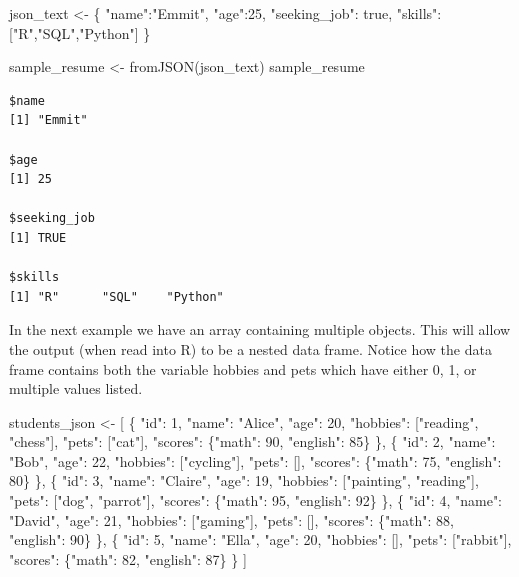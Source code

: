\documentclass[
  letterpaper,
  DIV=11,
  numbers=noendperiod]{scrreprt}
\newenvironment{Shaded}{\begin{snugshade}}{\end{snugshade}}
\newcommand{\FunctionTok}[1]{\textcolor[rgb]{0.28,0.35,0.67}{#1}}
\newcommand{\NormalTok}[1]{\textcolor[rgb]{0.00,0.23,0.31}{#1}}
\newcommand{\OtherTok}[1]{\textcolor[rgb]{0.00,0.23,0.31}{#1}}
\newcommand{\StringTok}[1]{\textcolor[rgb]{0.13,0.47,0.30}{#1}}
\begin{document}
\begin{Shaded}
\begin{Highlighting}[]
\NormalTok{json\_text }\OtherTok{\textless{}{-}} \StringTok{\textquotesingle{}\{}
\StringTok{                "name":"Emmit",}
\StringTok{                "age":25,}
\StringTok{                "seeking\_job": true,}
\StringTok{                "skills":["R","SQL","Python"]}
\StringTok{              \}\textquotesingle{}}

\NormalTok{sample\_resume }\OtherTok{\textless{}{-}} \FunctionTok{fromJSON}\NormalTok{(json\_text)}
\NormalTok{sample\_resume}
\end{Highlighting}
\end{Shaded}

\begin{verbatim}
$name
[1] "Emmit"

$age
[1] 25

$seeking_job
[1] TRUE

$skills
[1] "R"      "SQL"    "Python"
\end{verbatim}

In the next example we have an array containing multiple objects. This
will allow the output (when read into R) to be a nested data frame.
Notice how the data frame contains both the variable hobbies and pets
which have either 0, 1, or multiple values listed.

\begin{Shaded}
\begin{Highlighting}[]
\NormalTok{students\_json }\OtherTok{\textless{}{-}} \StringTok{\textquotesingle{}[}
\StringTok{  \{}
\StringTok{    "id": 1,}
\StringTok{    "name": "Alice",}
\StringTok{    "age": 20,}
\StringTok{    "hobbies": ["reading", "chess"],}
\StringTok{    "pets": ["cat"],}
\StringTok{    "scores": \{"math": 90, "english": 85\}}
\StringTok{  \},}
\StringTok{  \{}
\StringTok{    "id": 2,}
\StringTok{    "name": "Bob",}
\StringTok{    "age": 22,}
\StringTok{    "hobbies": ["cycling"],}
\StringTok{    "pets": [],}
\StringTok{    "scores": \{"math": 75, "english": 80\}}
\StringTok{  \},}
\StringTok{  \{}
\StringTok{    "id": 3,}
\StringTok{    "name": "Claire",}
\StringTok{    "age": 19,}
\StringTok{    "hobbies": ["painting", "reading"],}
\StringTok{    "pets": ["dog", "parrot"],}
\StringTok{    "scores": \{"math": 95, "english": 92\}}
\StringTok{  \},}
\StringTok{  \{}
\StringTok{    "id": 4,}
\StringTok{    "name": "David",}
\StringTok{    "age": 21,}
\StringTok{    "hobbies": ["gaming"],}
\StringTok{    "pets": [],}
\StringTok{    "scores": \{"math": 88, "english": 90\}}
\StringTok{  \},}
\StringTok{  \{}
\StringTok{    "id": 5,}
\StringTok{    "name": "Ella",}
\StringTok{    "age": 20,}
\StringTok{    "hobbies": [],}
\StringTok{    "pets": ["rabbit"],}
\StringTok{    "scores": \{"math": 82, "english": 87\}}
\StringTok{  \}}
\StringTok{]\textquotesingle{}}
\end{Highlighting}
\end{Shaded}
\end{document}
